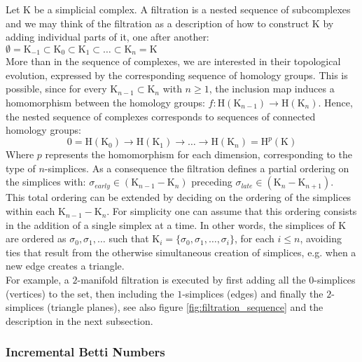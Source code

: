 Let $\mathrm{K}$ be a simplicial complex. A filtration is a nested sequence of subcomplexes and we may think of the filtration as a description of how to construct $\mathrm{K}$ by adding individual parts of it, one after another: $\emptyset = \mathrm{K}_{-1} \subset \mathrm{K}_{0} \subset \mathrm{K}_{1} \subset \dots \subset \mathrm{K}_{n} = \mathrm{K}$\\
More than in the sequence of complexes, we are interested in their topological evolution, expressed by the corresponding sequence of homology groups.
This is possible, since for every $\mathrm{K}_{n-1} \subset \mathrm{K}_{n}$ with $n \geq 1$, the inclusion map induces a homomorphism between the homology groups: $f : \mathrm{H}(\mathrm{K}_{n-1}) \rightarrow \mathrm{H}(\mathrm{K}_{n})$.
Hence, the nested sequence of complexes corresponds to sequences of connected homology groups:
\begin{equation} \label{eq:filtration_persistence}
	0 = \mathrm{H}(\mathrm{K}_{0}) \rightarrow \mathrm{H}(\mathrm{K}_{1}) \rightarrow \dots \rightarrow \mathrm{H}(\mathrm{K}_{n}) = \mathrm{H}^{p}(\mathrm{K})
\end{equation}
Where $p$ represents the homomorphism for each dimension, corresponding to the type of $n$-simplices.
As a consequence the filtration defines a partial ordering on the simplices with: $\sigma_{early} \in (\mathrm{K}_{n-1}-\mathrm{K}_{n})$ preceding $\sigma_{late} \in (\mathrm{K}_{n}-\mathrm{K}_{n+1})$.\\
This total ordering can be extended by deciding on the ordering of the simplices within each $\mathrm{K}_{n-1}-\mathrm{K}_{n}$.
For simplicity one can assume that this ordering consists in the addition of a single simplex at a time.
In other words, the simplices of $\mathrm{K}$ are ordered as $\sigma_{0}, \sigma_{1}, \dots$ such that $\mathrm{K}_{i} = \{\sigma_{0}, \sigma_{1}, \dots, \sigma_{i}\}$, for each $i \leq n$, avoiding ties that result from the otherwise simultaneous creation of simplices, e.g. when a new edge creates a triangle.\\
For example, a $2$-manifold filtration is executed by first adding all the $0$-simplices (vertices) to the set, then including the $1$-simplices (edges) and finally the $2$-simplices (triangle planes), see also figure \ref{fig:filtration_sequence} and the description in the next subsection.

\subsubsection{Incremental Betti Numbers}
\label{math_incremental_betti}

